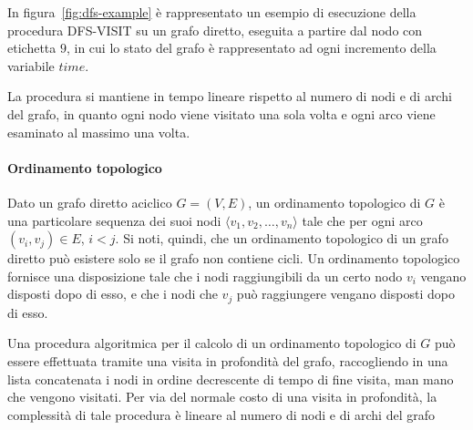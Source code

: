 In figura~\ref{fig:dfs-example} \`e rappresentato un esempio di esecuzione della procedura DFS-VISIT su un grafo
diretto, eseguita a partire dal nodo con etichetta $9$, in cui lo stato del grafo \`e rappresentato ad ogni
incremento della variabile $time$. \newline

La procedura si mantiene in tempo lineare rispetto al numero di nodi e di archi del grafo, in quanto
ogni nodo viene visitato una sola volta e ogni arco viene esaminato al massimo una volta.

\paragraph{Ordinamento topologico}
Dato un grafo diretto aciclico $G = (V, E)$, un ordinamento topologico di $G$ \`e una particolare sequenza
dei suoi nodi $\langle v_1, v_2, \ldots, v_n \rangle$ tale che per ogni arco $(v_i, v_j) \in E$, $i < j$.
Si noti, quindi, che un ordinamento topologico di un grafo diretto pu\`o esistere solo se il grafo non contiene
cicli.
Un ordinamento topologico fornisce una disposizione tale che i nodi raggiungibili da un certo nodo $v_i$ vengano
disposti dopo di esso, e che i nodi che $v_j$ pu\`o raggiungere vengano disposti dopo di esso.

Una procedura algoritmica per il calcolo di un ordinamento topologico di $G$ pu\`o essere effettuata tramite una
visita in profondit\`a del grafo, raccogliendo in una lista concatenata i nodi in ordine decrescente di tempo
di fine visita, man mano che vengono visitati.
Per via del normale costo di una visita in profondit\`a, la complessit\`a di tale procedura \`e lineare al
numero di nodi e di archi del grafo \newline



